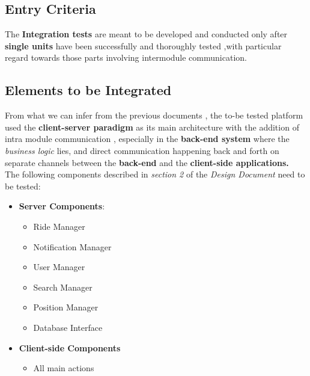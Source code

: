 \subsection{Entry Criteria}
The \textbf{Integration tests} are meant to be developed and conducted only after \textbf{single units} have been successfully and thoroughly tested ,with particular regard towards those parts involving intermodule communication.\\


\subsection{Elements to be Integrated}
From what we can infer from the previous documents , the to-be tested platform
used the \textbf{client-server paradigm} as its main architecture with the addition of intra module communication , especially in the \textbf{back-end system} where the \textit{business logic} lies, and direct communication happening back and forth on separate channels between the \textbf{back-end} and the \textbf{client-side applications.} \\
The following components described in \emph{section 2} of the \emph{Design Document} need to be tested:
\begin{itemize}
\item \textbf{Server Components}:
\begin{itemize}
\item Ride Manager
\item Notification Manager
\item User Manager
\item Search Manager
\item Position Manager
\item Database Interface
\end{itemize}
\item \textbf{Client-side Components}
\begin{itemize}
\item All main actions
\end{itemize}
\end{itemize}

